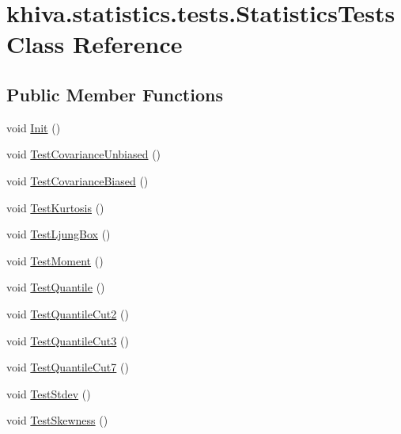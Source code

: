 \hypertarget{classkhiva_1_1statistics_1_1tests_1_1_statistics_tests}{}\section{khiva.\+statistics.\+tests.\+Statistics\+Tests Class Reference}
\label{classkhiva_1_1statistics_1_1tests_1_1_statistics_tests}
\subsection*{Public Member Functions}
\begin{DoxyCompactItemize}
\item 
void \mbox{\hyperlink{classkhiva_1_1statistics_1_1tests_1_1_statistics_tests_a4b6360c19b7dc8d242485d040206dca7}{Init}} ()
\item 
void \mbox{\hyperlink{classkhiva_1_1statistics_1_1tests_1_1_statistics_tests_a6ccc72b6d4aa368f8cf7442489f31afe}{Test\+Covariance\+Unbiased}} ()
\item 
void \mbox{\hyperlink{classkhiva_1_1statistics_1_1tests_1_1_statistics_tests_a035d0f2062a28a1264c76013ec8aaa62}{Test\+Covariance\+Biased}} ()
\item 
void \mbox{\hyperlink{classkhiva_1_1statistics_1_1tests_1_1_statistics_tests_a7718e3bde3db7facfb4b9cbf64b5e06f}{Test\+Kurtosis}} ()
\item 
void \mbox{\hyperlink{classkhiva_1_1statistics_1_1tests_1_1_statistics_tests_ac4244c9d3e156a6f3d2a02ebd992b5a5}{Test\+Ljung\+Box}} ()
\item 
void \mbox{\hyperlink{classkhiva_1_1statistics_1_1tests_1_1_statistics_tests_a4c61fa764bc1ef026f56da971380b56e}{Test\+Moment}} ()
\item 
void \mbox{\hyperlink{classkhiva_1_1statistics_1_1tests_1_1_statistics_tests_a0ca2ba2e60d4617a253b0b8e9ebb810d}{Test\+Quantile}} ()
\item 
void \mbox{\hyperlink{classkhiva_1_1statistics_1_1tests_1_1_statistics_tests_a87896e44e2e1538767931e473ed4a141}{Test\+Quantile\+Cut2}} ()
\item 
void \mbox{\hyperlink{classkhiva_1_1statistics_1_1tests_1_1_statistics_tests_a8acff2bfbd29dd3c54fb48b2e0a0efd9}{Test\+Quantile\+Cut3}} ()
\item 
void \mbox{\hyperlink{classkhiva_1_1statistics_1_1tests_1_1_statistics_tests_aa52af32975d55d8bb5031890d07cc5de}{Test\+Quantile\+Cut7}} ()
\item 
void \mbox{\hyperlink{classkhiva_1_1statistics_1_1tests_1_1_statistics_tests_aea520bbbe8023ed5a3eb8bb1a724a695}{Test\+Stdev}} ()
\item 
void \mbox{\hyperlink{classkhiva_1_1statistics_1_1tests_1_1_statistics_tests_aaab247eb80f08e6f3a34316f3e927439}{Test\+Skewness}} ()
\end{DoxyCompactItemize}


